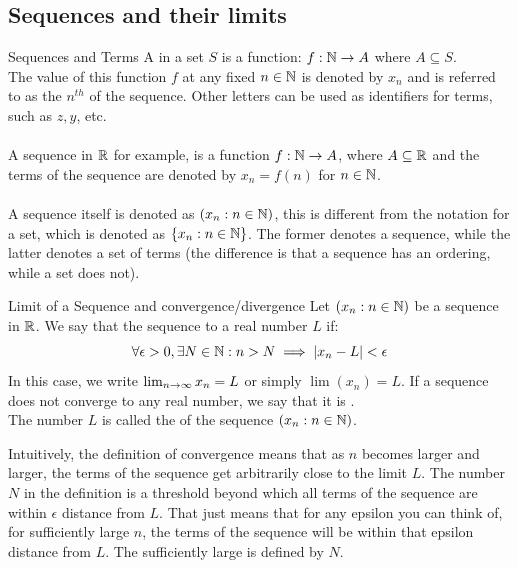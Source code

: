 \documentclass[openany]{book}
\begin{document}
\subsection{Sequences and their limits}
\begin{mydefinition}{Sequences and Terms}
    A  in a set $S$ is a function: $f: \mathbb{N} \rightarrow A$ where $A \subseteq S$. \\ 
    The value of this function $f$ at any fixed $n \in \mathbb{N}$ is denoted by $x_n$ and is referred to as the  $n^{th}$  of the sequence. Other letters can be used as identifiers for terms, such as $z, y$, etc. \\\\
    A sequence in $\mathbb{R}$ for example, is a function $f: \mathbb{N} \rightarrow A$, where $A \subseteq \mathbb{R}$ and the terms of the sequence are denoted by $x_n = f(n)$ for $n \in \mathbb{N}$. \\\\
    A sequence itself is denoted as $(x_n : n \in \mathbb{N})$, this is different from the notation for a set, which is denoted as $\{x_n : n \in \mathbb{N}\}$. The former denotes a sequence, while the latter denotes a set of terms (the difference is that a sequence has an ordering, while a set does not). 
\end{mydefinition}
\begin{mydefinition}{Limit of a Sequence and convergence/divergence}
    Let $(x_n : n \in \mathbb{N})$ be a sequence in $\mathbb{R}$. We say that the sequence  to a real number $L$ if:
    $$\forall \epsilon > 0, \exists N \in \mathbb{N}: n > N \implies |x_n - L| < \epsilon$$
    In this case, we write $\lim_{n \to \infty} x_n = L$ or simply $\lim(x_n) = L$. If a sequence does not converge to any real number, we say that it is . \\
    The number $L$ is called the  of the sequence $(x_n : n \in \mathbb{N})$.
\end{mydefinition}
\begin{mynote}
    Intuitively, the definition of convergence means that as $n$ becomes larger and larger, the terms of the sequence get arbitrarily close to the limit $L$. The number $N$ in the definition is a threshold beyond which all terms of the sequence are within $\epsilon$ distance from $L$. That just means that for any epsilon you can think of, for sufficiently large $n$, the terms of the sequence will be within that epsilon distance from $L$. The sufficiently large is defined by $N$.
\end{mynote}
\end{document}
